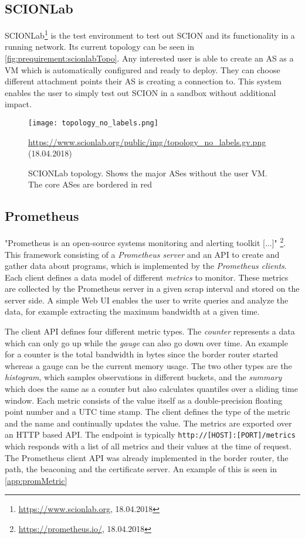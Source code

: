 \documentclass[thesis.tex]{subfiles}
\begin{document}
\subsection{SCIONLab}

SCIONLab\footnote{\url{https://www.scionlab.org}, 18.04.2018} is the test environment to test out SCION and its functionality in a running network. Its current topology can be seen in \autoref{fig:prequirement:scionlabTopo}. Any interested user is able to create an AS as a VM which is automatically configured and ready to deploy. They can choose different attachment points their AS is creating a connection to. This system enables the user to simply test out SCION in a sandbox without additional impact.

\begin{figure}
	\centering
	\texttt{[image: topology\_no\_labels.png]}
	\caption*{\tiny{\url{https://www.scionlab.org/public/img/topology_no_labels.gv.png} (18.04.2018)}}
	\caption{SCIONLab topology. Shows the major ASes without the user VM. The core ASes are bordered in red}
	\label{fig:prequirement:scionlabTopo}
\end{figure}

\subsection{Prometheus} 

"Prometheus is an open-source systems monitoring and alerting toolkit [...]" \footnote{\url{https://prometheus.io/}, 18.04.2018}. This framework consisting of a \textit{Prometheus server} and an API to create and gather data about programs, which is implemented by the \textit{Prometheus clients}. Each client defines a data model of different \textit{metrics} to monitor. These metrics are collected by the Prometheus server in a given scrap interval and stored on the server side. A simple Web UI enables the user to write queries and analyze the data, for example extracting the maximum bandwidth at a given time.

The client API defines four different metric types. The \textit{counter} represents a data which can only go up while the \textit{gauge} can also go down over time. An example for a counter is the total bandwidth in bytes since the border router started whereas a gauge can be the current memory usage. The two other types are the \textit{histogram}, which samples observations in different buckets, and the \textit{summary} which does the same as a counter but also calculates quantiles over a sliding time window. Each metric consists of the value itself as a double-precision floating point number and a UTC time stamp. The client defines the type of the metric and the name and continually updates the value. The metrics are exported over an HTTP based API. The endpoint is typically {\lstinline|http://[HOST]:[PORT]/metrics|} which responds with a list of all metrics and their values at the time of request. The Prometheus client API was already implemented in the border router, the path, the beaconing and the certificate server. An example of this is seen in \autoref{app:promMetric}
\end{document}
